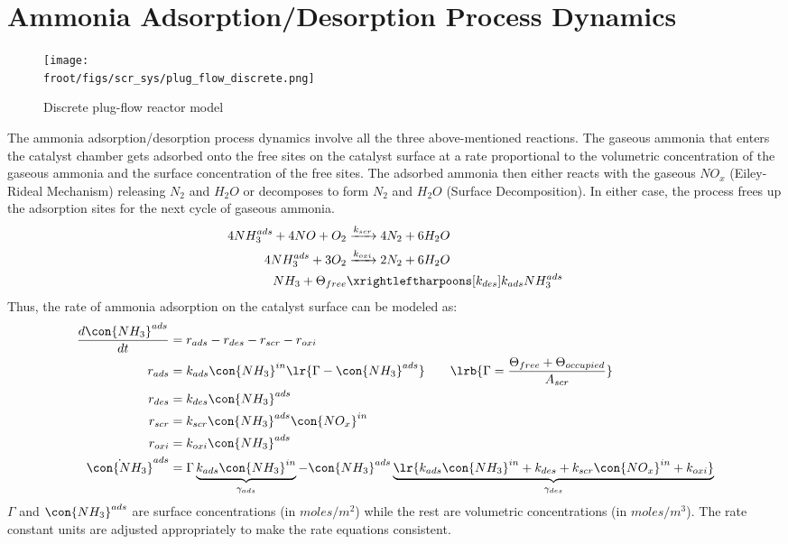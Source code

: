 \newpage
\section{Ammonia Adsorption/Desorption Process Dynamics}
\begin{figure}[H]
    \centering
    \texttt{[image: \\froot/figs/scr\_sys/plug\_flow\_discrete.png]}
    \caption{Discrete plug-flow reactor model}
    \label{fig:plug_flow_discrete}
\end{figure}
The ammonia adsorption/desorption process dynamics involve all the three above-mentioned reactions. The gaseous ammonia
that enters the catalyst chamber gets adsorbed onto the free sites on the catalyst surface at a rate proportional to the
volumetric concentration of the gaseous ammonia and the surface concentration of the free sites. The adsorbed ammonia
then either reacts with the gaseous $NO_x$ (Eiley-Rideal Mechanism) releasing $N_2$ and $H_2O$ or decomposes to form
$N_2$ and $H_2O$ (Surface Decomposition). In either case, the process frees up the adsorption sites for the next cycle
of gaseous ammonia.
\begin{align*}
    4 NH_3 ^{ads} + 4 NO + O_2 &\xrightarrow[]{k_{scr}} 4 N_2 + 6 H_2O \\
    4 NH_3^{ads} + 3 O_2 &\xrightarrow[]{k_{oxi}} 2 N_2 + 6 H_2O \\
    NH_3 + \Theta_{free} &\xrightleftharpoons[k_{des}]{k_{ads}} NH_3^{ads}
\end{align*}
Thus, the rate of ammonia adsorption on the catalyst surface can be modeled as:
\begin{align*}
    \frac{d \con{NH_3}^{ads}}{dt} &= r_{ads} - r_{des} - r_{scr} - r_{oxi}\\
    r_{ads} &= k_{ads} \con{NH_3}^{in} \lr{\Gamma - \con{NH_3}^{ads}} \qquad \lrb{\Gamma = \frac{\Theta_{free} + \Theta_{occupied}}{A_{scr}}}\\
    r_{des} &= k_{des} \con{NH_3}^{ads}\\
    r_{scr} &= k_{scr} \con{NH_3}^{ads} \con{NO_x}^{in}\\
    r_{oxi} &= k_{oxi} \con{NH_3}^{ads}\\
    \dot{\con{NH_3}}^{ads} &= \Gamma \underbrace{k_{ads} \con{NH_3}^{in}}_{\gamma_{ads}} - \con{NH_3}^{ads} \underbrace{\lr{k_{ads} \con{NH_3}^{in} + k_{des} + k_{scr} \con{NO_x}^{in} + k_{oxi}}}_{\gamma_{des}}
\end{align*}
 $\Gamma$ and $\con{NH_3}^{ads}$ are surface concentrations (in $moles/m^2$) while the rest are volumetric
concentrations (in $moles/m^3$). The rate constant units are adjusted appropriately to make the rate equations
consistent.

